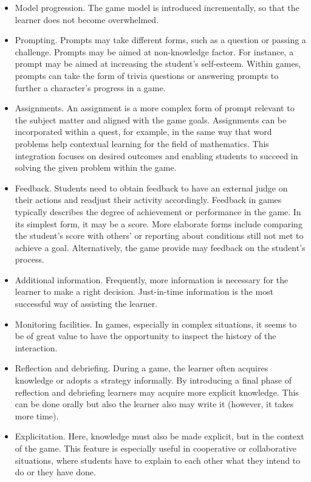 \documentclass{sig-alternate-05-2015}
\begin{document}
\begin{itemize}
\item Model progression. The game model is introduced incrementally, so that the learner does not become overwhelmed.
\item Prompting. Prompts may take different forms, such as a question or passing a challenge. Prompts may be aimed at non-knowledge factor. For instance, a prompt may be aimed at increasing the student's self-esteem. Within games, prompts can take the form of trivia questions or answering prompts to further a character's progress in a game.
\item Assignments. An assignment is a more complex form of prompt relevant to the subject matter and aligned with the game goals.  Assignments can be incorporated within a quest, for example, in the same way that word problems help contextual learning for the field of mathematics. This integration focuses on desired outcomes and enabling students to succeed in solving the given problem within the game. 
\item Feedback. Students need to obtain feedback to have an external judge on their actions and readjust their activity accordingly. Feedback in games typically describes the degree of achievement or performance in the game. In its simplest form, it may be a score. More elaborate forms include comparing the student's score with others' or reporting about conditions still not met to achieve a goal. Alternatively, the game provide may feedback on the student's process.
\item Additional information. Frequently, more information is necessary for the learner to make a right decision. Just-in-time information is the most successful way of assisting the learner.
\item Monitoring facilities. In games, especially in complex situations, it seems to be of great value to have the opportunity to inspect the history of the interaction.
\item Reflection and debriefing. During a game, the learner often acquires knowledge or adopts a strategy informally. By introducing a final phase of reflection and debriefing learners may acquire more explicit knowledge. This can be done orally but also the learner also may write it (however, it takes more time).
\item Explicitation. Here, knowledge must also be made explicit, but in the context of the game. This feature is especially useful in cooperative or collaborative situations, where students have to explain to each other what they intend to do or they have done.
\end{itemize}
\begin{quote}


 \end{quote}
\end{document}
